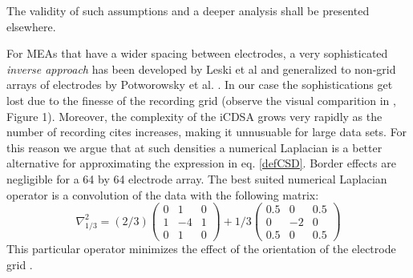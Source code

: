 \documentclass{article}
\begin{document}
The validity of such assumptions and a deeper analysis shall be presented elsewhere. 

For MEAs that have a wider spacing between electrodes, a very sophisticated \emph{inverse approach} has been developed by Leski et al \cite{Leski2011} and generalized to non-grid arrays of electrodes by Potworowsky et al. \cite{Potworowsky2011}. In our case the sophistications get lost due to the finesse of the recording grid (observe the visual comparition in \cite{Potworowsky}, Figure 1). Moreover, the complexity of the iCDSA grows very rapidly as the number of recording cites increases, making it unnusuable for large data sets. For this reason we argue that at such densities a numerical Laplacian is a better alternative for approximating the expression in eq. \ref{defCSD}. Border effects are negligible for a 64 by 64 electrode array. The best suited numerical Laplacian operator is a convolution of the data  with the following matrix:
\begin{equation}
\nabla^2_{1/3}=(2/3)
\begin{pmatrix}
  0 & 1 & 0 \\
  1 & -4 & 1 \\
  0 & 1 & 0
\end{pmatrix}
+1/3
\begin{pmatrix}
  0.5 & 0 & 0.5 \\
  0 & -2 & 0 \\
  0.5 & 0 & 0.5
\end{pmatrix}  
\end{equation}
This particular operator minimizes the effect of the orientation of the electrode grid 
\cite{Lindberg90}.
\end{document}

